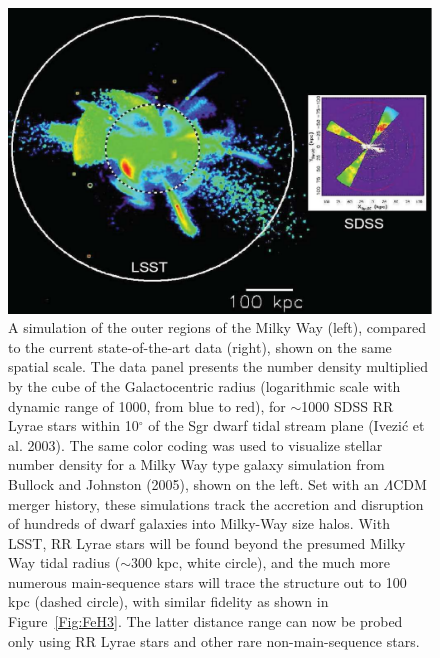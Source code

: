 \documentclass{emulateapj}
\begin{document}
\begin{figure}
\includegraphics[width=1.0\hsize,clip]{halo.pdf}
\caption{A simulation of the outer regions of the Milky Way (left), compared to the 
current state-of-the-art data (right), shown on the same spatial scale. The data panel 
presents the number density multiplied by the cube of the Galactocentric
radius (logarithmic scale with dynamic range of 1000, from blue to red), for $\sim$1000 
SDSS RR Lyrae stars within 10$^\circ$ of the Sgr dwarf tidal stream plane (Ivezi\'{c} et 
al. 2003). The same color coding was used to visualize stellar number density for a Milky 
Way type galaxy simulation from Bullock and Johnston (2005), shown on the left. Set with 
an $\Lambda$CDM merger history, these simulations track the accretion and 
disruption of hundreds of dwarf galaxies into Milky-Way size halos. With LSST, RR Lyrae 
stars will be found beyond the presumed Milky Way tidal radius ($\sim$300 kpc, white circle), 
and the much more numerous main-sequence stars will trace the structure out to 100 kpc 
(dashed circle), with similar fidelity as shown in Figure~\ref{Fig:FeH3}. The latter 
distance range can now be probed only using RR Lyrae stars and other rare 
non-main-sequence stars.} 
\label{Fig:halo}
\end{figure}
 
\end{document}
